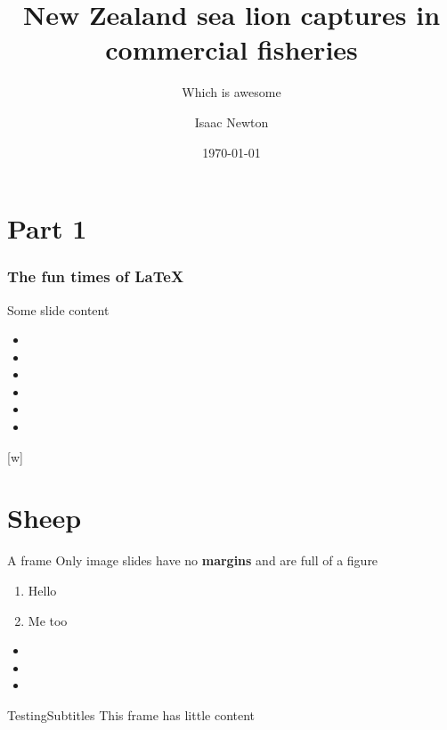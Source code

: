 \documentclass[xcolor={table}]{beamer}
\title{New Zealand sea lion captures in commercial fisheries}
\subtitle{Which is awesome}
\author{Isaac Newton}
\date{\today}
\begin{document}
\titleslide

\section{Part 1}

\begin{frame}
  \frametitle{The fun times of \LaTeX}
  Some slide content
\begin{itemize}
  \item \the\topmargin
  \item \the\headheight
  \item \the\headsep
  \item \the\textheight
  \item \the\footskip
  \item \the\paperheight
\end{itemize}
\end{frame}

[w]%

\section{Sheep}

\begin{frame}{A frame}
  Only image slides have no \textbf{margins} and are full of a figure


\begin{enumerate}
  \item Hello
  \item Me too
\end{enumerate}
\begin{itemize}
  \item \the\paperheight
  \item \the\footskip
  \item \the\textheight
\end{itemize}
 \end{frame}

 \begin{frame}{Testing}{Subtitles}
This frame has little content
 \end{frame}
\end{document}
